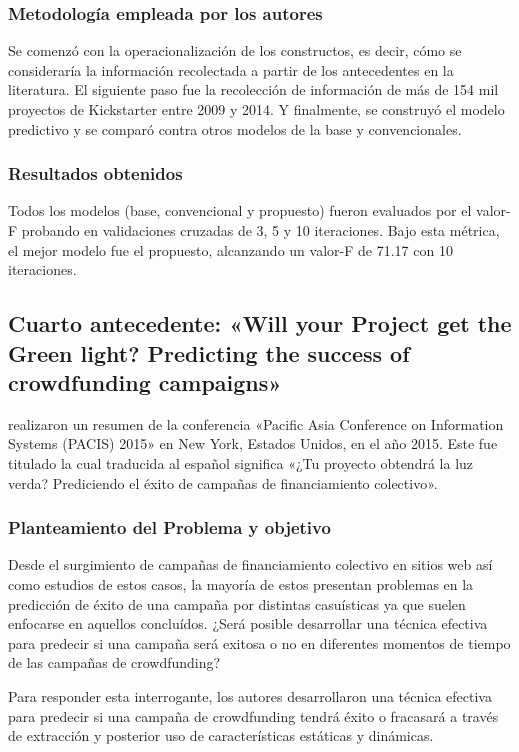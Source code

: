 \subsubsection{Metodología empleada por los autores}
Se comenzó con la operacionalización de los constructos, es decir, cómo se consideraría la información recolectada a partir de los antecedentes en la literatura. El siguiente paso fue la recolección de información de más de 154 mil proyectos de Kickstarter entre 2009 y 2014. Y finalmente, se construyó el modelo predictivo y se comparó contra otros modelos de la base y convencionales.

\subsubsection{Resultados obtenidos}
Todos los modelos (base, convencional y propuesto) fueron evaluados por el valor-F probando en validaciones cruzadas de 3, 5 y 10 iteraciones. Bajo esta métrica, el mejor modelo fue el propuesto, alcanzando un valor-F de 71.17 con 10 iteraciones.

\subsection{Cuarto antecedente: «Will your Project get the Green light? Predicting the success of crowdfunding campaigns» \citep*{pr_chen2015predcrowd}}
\citeauthor{pr_chen2015predcrowd} realizaron un resumen de la conferencia «Pacific Asia Conference on Information Systems (PACIS) 2015» en New York, Estados Unidos, en el año 2015. Este fue titulado  la cual traducida al español significa «¿Tu proyecto obtendrá la luz verda? Prediciendo el éxito de campañas de financiamiento colectivo».

\subsubsection{Planteamiento del Problema y objetivo}
Desde el surgimiento de campañas de financiamiento colectivo en sitios web así como estudios de estos casos, la mayoría de estos presentan problemas en la predicción de éxito de una campaña por distintas casuísticas ya que suelen enfocarse en aquellos concluídos. ¿Será posible desarrollar una técnica efectiva para predecir si una campaña será exitosa o no en diferentes momentos de tiempo de las campañas de crowdfunding?

Para responder esta interrogante, los autores desarrollaron una técnica efectiva para predecir si una campaña de crowdfunding tendrá éxito o fracasará a través de extracción y posterior uso de características estáticas y dinámicas.

